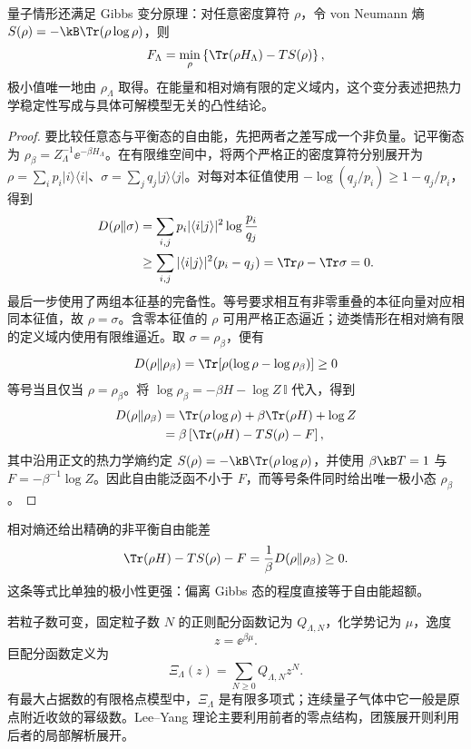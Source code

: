 \begin{theorem}
量子情形还满足 Gibbs 变分原理：对任意密度算符 \(\rho\)，令 von Neumann 熵 \(S(\rho)=-\kB\Tr(\rho\log\rho)\)，则
\begin{equation}
 F_\Lambda
 =\min_{\rho}
 \left\{
 \Tr(\rho H_\Lambda)-T S(\rho)
 \right\},
 \label{eq:phys-sm-gibbs-variational}
\end{equation}
极小值唯一地由 \(\rho_\Lambda\) 取得。在能量和相对熵有限的定义域内，这个变分表述把热力学稳定性写成与具体可解模型无关的凸性结论。
\end{theorem}

\begin{proof}
要比较任意态与平衡态的自由能，先把两者之差写成一个非负量。记平衡态为 \(\rho_\beta=Z_\Lambda^{-1}\ee^{-\beta H_\Lambda}\)。在有限维空间中，将两个严格正的密度算符分别展开为 \(\rho=\sum_i p_i|i\rangle\langle i|\)、\(\sigma=\sum_j q_j|j\rangle\langle j|\)。对每对本征值使用 \(-\log(q_j/p_i)\ge1-q_j/p_i\)，得到
\[
\begin{aligned}
D(\rho\Vert\sigma)
&=\sum_{i,j}p_i|\langle i|j\rangle|^2
   \log\frac{p_i}{q_j}\\
&\ge\sum_{i,j}|\langle i|j\rangle|^2(p_i-q_j)
=\Tr\rho-\Tr\sigma=0.
\end{aligned}
\]
最后一步使用了两组本征基的完备性。等号要求相互有非零重叠的本征向量对应相同本征值，故 \(\rho=\sigma\)。含零本征值的 \(\rho\) 可用严格正态逼近；迹类情形在相对熵有限的定义域内使用有限维逼近。取 \(\sigma=\rho_\beta\)，便有
\begin{equation*}
 D(\rho\Vert\rho_\beta)
 =\Tr\!\left[\rho(\log\rho-\log\rho_\beta)\right]\ge0
\end{equation*}
等号当且仅当 \(\rho=\rho_\beta\)。将
\(\log\rho_\beta=-\beta H-\log Z\,\mathbb I\) 代入，得到
\begin{align*}
 D(\rho\Vert\rho_\beta)
 &=\Tr(\rho\log\rho)+\beta\Tr(\rho H)+\log Z\\
 &=\beta\left[\Tr(\rho H)-T S(\rho)-F\right],
\end{align*}
其中沿用正文的热力学熵约定 \(S(\rho)=-\kB\Tr(\rho\log\rho)\)，并使用
\(\beta\kB T=1\) 与 \(F=-\beta^{-1}\log Z\)。因此自由能泛函不小于
\(F\)，而等号条件同时给出唯一极小态 \(\rho_\beta\)。
\end{proof}

相对熵还给出精确的非平衡自由能差
\[
 \Tr(\rho H)-T S(\rho)-F
 =\frac1\beta D(\rho\Vert\rho_\beta)\ge0.
\]
这条等式比单独的极小性更强：偏离 Gibbs 态的程度直接等于自由能超额。

若粒子数可变，固定粒子数 \(N\) 的正则配分函数记为 \(Q_{\Lambda,N}\)，化学势记为 \(\mu\)，逸度
\[
 z=\ee^{\beta\mu}.
\]
巨配分函数定义为
\begin{equation}
 \Xi_\Lambda(z)=\sum_{N\ge0}Q_{\Lambda,N}z^N.
 \label{eq:phys-sm-grand-partition-general}
\end{equation}
有最大占据数的有限格点模型中，\(\Xi_\Lambda\) 是有限多项式；连续量子气体中它一般是原点附近收敛的幂级数。Lee--Yang 理论主要利用前者的零点结构，团簇展开则利用后者的局部解析展开。

